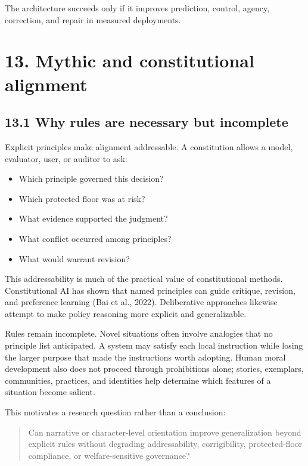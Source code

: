 \documentclass[
  11pt,
]{article}
\providecommand{\tightlist}{%
  \setlength{\itemsep}{0pt}\setlength{\parskip}{0pt}}
\begin{document}
The architecture succeeds only if it improves prediction, control,
agency, correction, and repair in measured deployments.

\section{13. Mythic and constitutional
alignment}\label{mythic-and-constitutional-alignment}

\subsection{13.1 Why rules are necessary but
incomplete}\label{why-rules-are-necessary-but-incomplete}

Explicit principles make alignment addressable. A constitution allows a
model, evaluator, user, or auditor to ask:

\begin{itemize}
\tightlist
\item
  Which principle governed this decision?
\item
  Which protected floor was at risk?
\item
  What evidence supported the judgment?
\item
  What conflict occurred among principles?
\item
  What would warrant revision?
\end{itemize}

This addressability is much of the practical value of constitutional
methods. Constitutional AI has shown that named principles can guide
critique, revision, and preference learning (Bai et al., 2022).
Deliberative approaches likewise attempt to make policy reasoning more
explicit and generalizable.

Rules remain incomplete. Novel situations often involve analogies that
no principle list anticipated. A system may satisfy each local
instruction while losing the larger purpose that made the instructions
worth adopting. Human moral development also does not proceed through
prohibitions alone; stories, exemplars, communities, practices, and
identities help determine which features of a situation become salient.

This motivates a research question rather than a conclusion:

\begin{quote}
Can narrative or character-level orientation improve generalization
beyond explicit rules without degrading addressability, corrigibility,
protected-floor compliance, or welfare-sensitive governance?
\end{quote}
\end{document}
